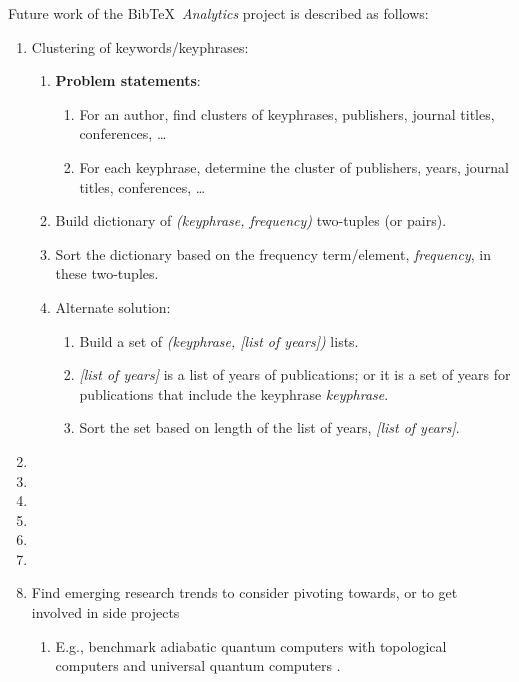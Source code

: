 Future work of the {\sc Bib}\TeX\ {\it Analytics} project is described as follows: \vspace{-0.3cm}
\begin{enumerate} \itemsep -4pt
\item Clustering of keywords/keyphrases: \vspace{-0.3cm}
	\begin{enumerate} \itemsep -2pt
	\item {\bf Problem statements}: \vspace{-0.2cm}
		\begin{enumerate} \itemsep -2pt
		\item For an author, find clusters of keyphrases, publishers, journal titles, conferences, \dots
		\item For each keyphrase, determine the cluster of publishers, years, journal titles, conferences, \dots
		\end{enumerate}
	\item Build dictionary of {\it (keyphrase, frequency)} two-tuples (or pairs).
	\item Sort the dictionary based on the frequency term/element, {\it frequency}, in these two-tuples.
	\item Alternate solution: \vspace{-0.2cm}
		\begin{enumerate} \itemsep -2pt
		\item Build a set of {\it (keyphrase, [list of years])} lists.
		\item {\it [list of years]} is a list of years of publications; or it is a set of years for publications that include the keyphrase {\it keyphrase}.
		\item Sort the set based on length of the list of years, {\it [list of years]}.
		\end{enumerate}
	\end{enumerate}
\item 
\item 
\item 
\item 
\item 
\item 
\item Find emerging research trends to consider pivoting towards, or to get involved in side projects \vspace{-0.3cm}
	\begin{enumerate} \itemsep -2pt
	\item E.g., benchmark adiabatic quantum computers with topological computers and universal quantum computers \cite{Tandon2017}.
	\end{enumerate}
\end{enumerate}

























